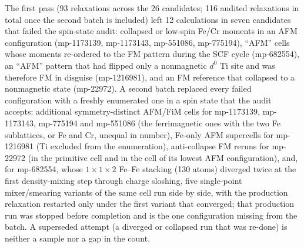 \documentclass[aps,prb,preprint,superscriptaddress,longbibliography,nofootinbib]{revtex4-2}
\begin{document}
The first pass (93 relaxations across the 26 candidates; 116 audited relaxations in total once the second
batch is included) left 12 calculations in seven candidates that failed the spin-state audit: collapsed or
low-spin Fe/Cr moments in an AFM configuration (mp-1173139, mp-1173143, mp-551086, mp-775194), ``AFM'' cells
whose moments re-ordered to the FM pattern during the SCF cycle (mp-682554), an ``AFM'' pattern that had
flipped only a nonmagnetic $d^0$ Ti site and was therefore FM in disguise (mp-1216981), and an FM reference
that collapsed to a nonmagnetic state (mp-22972). A second batch replaced every failed configuration with a
freshly enumerated one in a spin state that the audit accepts: additional symmetry-distinct AFM/FiM cells for
mp-1173139, mp-1173143, mp-775194 and mp-551086 (the ferrimagnetic ones with the two Fe sublattices, or Fe and
Cr, unequal in number), Fe-only AFM supercells for mp-1216981 (Ti excluded from the enumeration),
anti-collapse FM reruns for mp-22972 (in the primitive cell and in the cell of its lowest AFM configuration),
and, for mp-682554, whose $1\times1\times2$ Fe--Fe stacking (130 atoms)
diverged twice at the first density-mixing step through charge sloshing, five single-point mixer/smearing
variants of the same cell run side by side, with the production relaxation restarted only under the first
variant that converged; that production run was stopped before completion and is the one configuration
missing from the batch. A superseded attempt (a diverged or collapsed run that was re-done) is neither a sample
nor a gap in the count.
\end{document}
